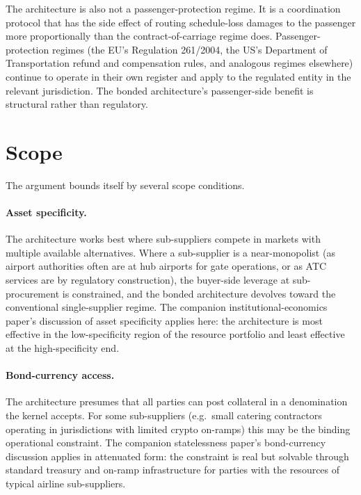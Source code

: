 \documentclass[11pt,a4paper]{article}
\theoremstyle{definition}
\theoremstyle{remark}
\begin{document}
The architecture is also not a passenger-protection regime. It is
a coordination protocol that has the side effect of routing
schedule-loss damages to the passenger more proportionally than
the contract-of-carriage regime does. Passenger-protection
regimes (the EU's Regulation 261/2004, the US's Department of
Transportation refund and compensation rules, and analogous
regimes elsewhere) continue to operate in their own register and
apply to the regulated entity in the relevant jurisdiction. The
bonded architecture's passenger-side benefit is structural rather
than regulatory.

\section{Scope}
\label{sec:scope}

The argument bounds itself by several scope conditions.

\paragraph{Asset specificity.}
The architecture works best where sub-suppliers compete in markets
with multiple available alternatives. Where a sub-supplier is a
near-monopolist (as airport authorities often are at hub airports
for gate operations, or as ATC services are by regulatory
construction), the buyer-side leverage at sub-procurement is
constrained, and the bonded architecture devolves toward the
conventional single-supplier regime. The companion
institutional-economics paper's discussion of asset specificity
applies here: the architecture is most effective in the
low-specificity region of the resource portfolio and least
effective at the high-specificity end.

\paragraph{Bond-currency access.}
The architecture presumes that all parties can post collateral in
a denomination the kernel accepts. For some sub-suppliers (e.g.\
small catering contractors operating in jurisdictions with
limited crypto on-ramps) this may be the binding operational
constraint. The companion statelessness paper's bond-currency
discussion applies in attenuated form: the constraint is real but
solvable through standard treasury and on-ramp infrastructure for
parties with the resources of typical airline sub-suppliers.
\end{document}
